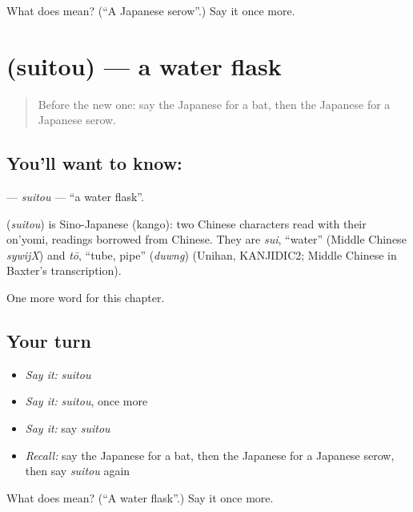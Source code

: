 \begin{tcolorbox}[breakable,colback=teal!4,colframe=teal!35!black,title={Before you move on}]
What does  mean? (\textquotedblleft{}A Japanese serow\textquotedblright{}.) Say it once more.
\end{tcolorbox}
\section[\texorpdfstring{\ja{すいとう} (suitou)}{すいとう (suitou)}]{ (suitou) — a water flask}

\label{lesson:JA-C117-suitou}



\begin{quote}
Before the new one: say the Japanese for a bat, then the Japanese for a Japanese serow.
\end{quote}

\subsection*{You'll want to know: }
\textbf{} — \emph{suitou} — \textquotedblleft{}a water flask\textquotedblright{}.

\begin{cousinweb}
\textbf{} (\emph{suitou}) is Sino-Japanese (kango): two Chinese characters read with their on'yomi, readings borrowed from Chinese. They are \emph{sui}, \textquotedblleft{}water\textquotedblright{} (Middle Chinese \emph{sywijX}) and \emph{tō}, \textquotedblleft{}tube, pipe\textquotedblright{} (\emph{duwng}) (Unihan, KANJIDIC2; Middle Chinese in Baxter's transcription).
\end{cousinweb}

\begin{grammarlens}[title={What you've built}]
One more word for this chapter.
\end{grammarlens}

\subsection*{Your turn}
\begin{itemize}
\raggedright
  \item \emph{Say it:} \emph{suitou}
  \item \emph{Say it:} \emph{suitou}, once more
  \item \emph{Say it:} say \emph{suitou}
  \item \emph{Recall:} say the Japanese for a bat, then the Japanese for a Japanese serow, then say \emph{suitou} again
\end{itemize}

\begin{tcolorbox}[breakable,colback=teal!4,colframe=teal!35!black,title={Before you move on}]
What does  mean? (\textquotedblleft{}A water flask\textquotedblright{}.) Say it once more.
\end{tcolorbox}

